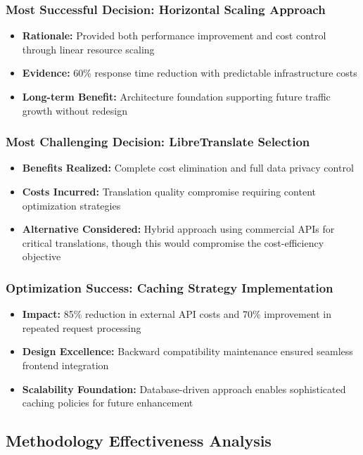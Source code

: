 \subsubsection{Most Successful Decision: Horizontal Scaling Approach}
\begin{itemize}
    \item \textbf{Rationale:} Provided both performance improvement and cost control through linear resource scaling
    \item \textbf{Evidence:} 60\% response time reduction with predictable infrastructure costs
    \item \textbf{Long-term Benefit:} Architecture foundation supporting future traffic growth without redesign
\end{itemize}

\subsubsection{Most Challenging Decision: LibreTranslate Selection}
\begin{itemize}
    \item \textbf{Benefits Realized:} Complete cost elimination and full data privacy control
    \item \textbf{Costs Incurred:} Translation quality compromise requiring content optimization strategies
    \item \textbf{Alternative Considered:} Hybrid approach using commercial APIs for critical translations, though this would compromise the cost-efficiency objective
\end{itemize}

\subsubsection{Optimization Success: Caching Strategy Implementation}
\begin{itemize}
    \item \textbf{Impact:} 85\% reduction in external API costs and 70\% improvement in repeated request processing
    \item \textbf{Design Excellence:} Backward compatibility maintenance ensured seamless frontend integration
    \item \textbf{Scalability Foundation:} Database-driven approach enables sophisticated caching policies for future enhancement
\end{itemize}

\subsection{Methodology Effectiveness Analysis}

